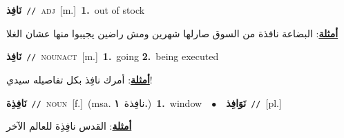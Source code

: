 \documentclass[10pt,a4paper,twoside]{article} %
\begin{document}
\begin{multicols}{2}
{\setlength\topsep{0pt}\textbf{\foreignlanguage{arabic}{نَافِذ}}\ {\color{gray}\texttt{//}\color{black}}\ \textsc{adj}\ [m.]\ \textbf{1.}~out of stock\  \begin{flushright}\color{gray}\foreignlanguage{arabic}{\textbf{\underline{\foreignlanguage{arabic}{أمثلة}}}: البضاعة نافذة من السوق صارلها شهرين ومش راضين يجيبوا منها عشان الغلا}\end{flushright}\color{black}} \vspace{2mm}

{\setlength\topsep{0pt}\textbf{\foreignlanguage{arabic}{نَافِذ}}\ {\color{gray}\texttt{//}\color{black}}\ \textsc{noun\textunderscore act}\ [m.]\ \textbf{1.}~going  \textbf{2.}~being executed\  \begin{flushright}\color{gray}\foreignlanguage{arabic}{\textbf{\underline{\foreignlanguage{arabic}{أمثلة}}}: أمرك نافِذ بكل تفاصيله سيدي!}\end{flushright}\color{black}} \vspace{2mm}

{\setlength\topsep{0pt}\textbf{\foreignlanguage{arabic}{نَافِذِة}}\ {\color{gray}\texttt{//}\color{black}}\ \textsc{noun}\ [f.]\ \color{gray}(msa. \foreignlanguage{arabic}{نافِذة}~\foreignlanguage{arabic}{\textbf{١.}})\color{black}\ \textbf{1.}~window\ \ $\bullet$\ \ \setlength\topsep{0pt}\textbf{\foreignlanguage{arabic}{نَوَافِذ}}\ {\color{gray}\texttt{//}\color{black}}\ [pl.]\  \begin{flushright}\color{gray}\foreignlanguage{arabic}{\textbf{\underline{\foreignlanguage{arabic}{أمثلة}}}: القدس نافِذِة للعالم الآخر}\end{flushright}\color{black}} \vspace{2mm}


\end{multicols}
\end{document}
